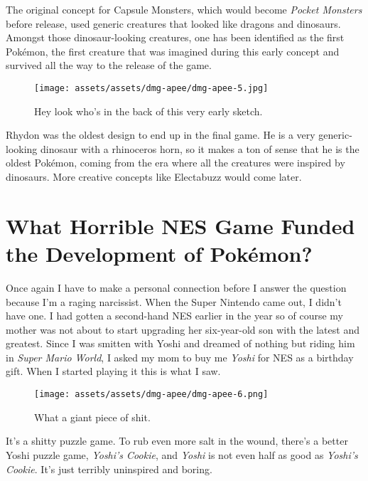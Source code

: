 \documentclass{book}
\begin{document}
The original concept for Capsule Monsters, which would become \emph{Pocket Monsters} before release, used generic creatures that looked like dragons and dinosaurs. Amongst those dinosaur-looking creatures, one has been identified as the first Pokémon, the first creature that was imagined during this early concept and survived all the way to the release of the game.

\begin{figure}[hbt]
\vskip 10pt
\centering \texttt{[image: assets/assets/dmg-apee/dmg-apee-5.jpg]}\par\pagetwodescription Hey look who’s in the back of this very early sketch.
\vskip 6pt
\end{figure}

Rhydon was the oldest design to end up in the final game. He is a very generic-looking dinosaur with a rhinoceros horn, so it makes a ton of sense that he is the oldest Pokémon, coming from the era where all the creatures were inspired by dinosaurs. More creative concepts like Electabuzz would come later.

\FloatBarrier\needspace{10mm}\section*{What Horrible NES Game Funded the Development of Pokémon?}\nopagebreak[4]

Once again I have to make a personal connection before I answer the question because I’m a raging narcissist. When the Super Nintendo came out, I didn’t have one. I had gotten a second-hand NES earlier in the year so of course my mother was not about to start upgrading her six-year-old son with the latest and greatest. Since I was smitten with Yoshi and dreamed of nothing but riding him in \emph{Super Mario World}, I asked my mom to buy me \emph{Yoshi} for NES as a birthday gift. When I started playing it this is what I saw.

\begin{figure}[hbt]
\vskip 10pt
\centering \texttt{[image: assets/assets/dmg-apee/dmg-apee-6.png]}\par\pagetwodescription What a giant piece of shit.
\vskip 6pt
\end{figure}

It’s a shitty puzzle game. To rub even more salt in the wound, there’s a better Yoshi puzzle game, \emph{Yoshi’s Cookie}, and \emph{Yoshi} is not even half as good as \emph{Yoshi’s Cookie}. It’s just terribly uninspired and boring.
\end{document}
